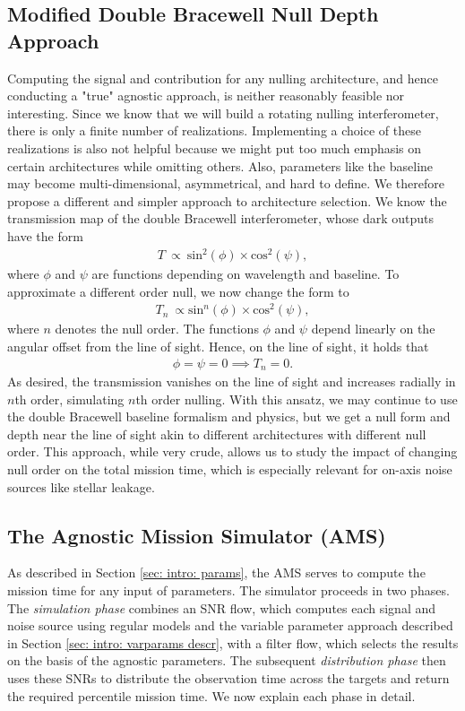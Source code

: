 \documentclass[12pt,a4paper]{article}
\numberwithin{equation}{section}
\numberwithin{figure}{section}
\numberwithin{table}{section}
\begin{document}
\subsection{Modified Double Bracewell Null Depth Approach} \label{sec: intro: null depth approach}
Computing the signal and contribution for any nulling architecture, and hence conducting a "true" agnostic approach, is neither reasonably feasible nor interesting. Since we know that we will build a rotating nulling interferometer, there is only a finite number of realizations. Implementing a choice of these realizations is also not helpful because we might put too much emphasis on certain architectures while omitting others. Also, parameters like the baseline may become multi-dimensional, asymmetrical, and hard to define. We therefore propose a different and simpler approach to architecture selection. We know the transmission map of the double Bracewell interferometer, whose dark outputs have the form
\begin{align}
    T\ \propto\ \text{sin}^2(\phi)\times \text{cos}^2(\psi),
\end{align}
where $\phi$ and $\psi$ are functions depending on wavelength and baseline. To approximate a different order null, we now change the form to
\begin{align}
    T_n\ \propto \text{sin}^n(\phi)\times \text{cos}^2(\psi),
\end{align}
where $n$ denotes the null order. The functions $\phi$ and $\psi$ depend linearly on the angular offset from the line of sight. Hence, on the line of sight, it holds that
\begin{align*}
    \phi = \psi = 0 \implies T_n = 0.
\end{align*}
As desired, the transmission vanishes on the line of sight and increases radially in $n$th order, simulating $n$th order nulling. With this ansatz, we may continue to use the double Bracewell baseline formalism and physics, but we get a null form and depth near the line of sight akin to different architectures with different null order. This approach, while very crude, allows us to study the impact of changing null order on the total mission time, which is especially relevant for on-axis noise sources like stellar leakage.

\subsection{The Agnostic Mission Simulator (AMS)} \label{sec: methods: AMS}
As described in Section \ref{sec: intro: params}, the AMS serves to compute the mission time for any input of parameters. The simulator proceeds in two phases. The \textit{simulation phase} combines an SNR flow, which computes each signal and noise source using regular models and the variable parameter approach described in Section \ref{sec: intro: varparams descr}, with a filter flow, which selects the results on the basis of the agnostic parameters. The subsequent \textit{distribution phase} then uses these SNRs to distribute the observation time across the targets and return the required percentile mission time. We now explain each phase in detail.
\end{document}
